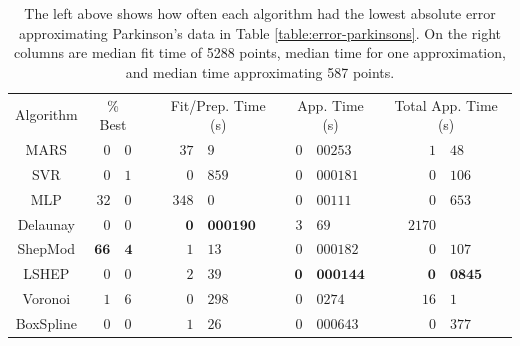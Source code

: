 \documentclass[smallextended,final]{svjour3}  %
\begin{document}
\begin{appendix}
\begin{table}
  \centering
  \begin{tabular}{|c|r@{.}l| c |r@{.}l|r@{.}l|r@{.}l|}
    \cline{1-3}\cline{5-10}
    Algorithm & \multicolumn{2}{c|}{\% Best} &  & \multicolumn{2}{c|}{Fit/Prep. Time (s)} & \multicolumn{2}{c|}{App. Time (s)} & \multicolumn{2}{c|}{Total App. Time (s)}\\
    \cline{1-3}\cline{5-10}
    MARS & \quad\,$0$&$0$ &  & \quad\quad$37$&$9$ & \quad\,\,$0$&$00253$ & \quad\quad\quad\,\,$1$&$48$\\
    SVR & $0$&$1$ &  & $0$&$859$ & $\mathit{0}$&$\mathit{000181}$ & $\mathit{0}$&$\mathit{106}$\\
    MLP & $\mathit{32}$&$\mathit{0}$ &  & $348$&$0$ & $0$&$00111$ & $0$&$653$\\
    Delaunay & $0$&$0$ &  & $\mathbf{0}$&$\mathbf{000190}$ & $3$&$69$ & $2170$&\\
    ShepMod & $\mathbf{66}$&$\mathbf{4}$ &  & $1$&$13$ & $0$&$000182$ & $0$&$107$\\
    LSHEP & $0$&$0$ &  & $2$&$39$ & $\mathbf{0}$&$\mathbf{000144}$ & $\mathbf{0}$&$\mathbf{0845}$\\
    Voronoi & $1$&$6$ &  & $\mathit{0}$&$\mathit{298}$ & $0$&$0274$ & $16$&$1$\\
    BoxSpline & $0$&$0$ &  & $1$&$26$ & $0$&$000643$ & $0$&$377$\\
    \cline{1-3}\cline{5-10}
  \end{tabular}
  \caption{The left above shows how often each algorithm had the
    lowest absolute error approximating Parkinson's data in Table
    \ref{table:error-parkinsons}. On the right columns are median fit
    time of 5288 points, median time for one approximation, and median
    time approximating 587 points.}
  \label{table:best-parkinsons}
\end{table}



\end{appendix}
\end{document}
